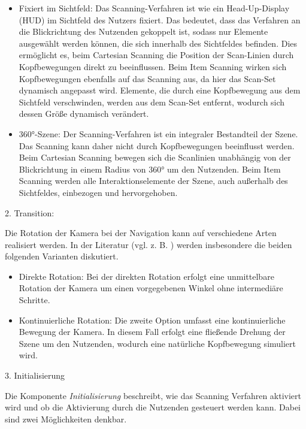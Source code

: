 \begin{itemize}
    \item Fixiert im Sichtfeld: Das Scanning-Verfahren ist wie ein Head-Up-Display (HUD) im Sichtfeld des Nutzers fixiert. Das bedeutet, dass das Verfahren an die Blickrichtung des Nutzenden gekoppelt ist, sodass nur Elemente ausgewählt werden können, die sich innerhalb des Sichtfeldes befinden. Dies ermöglicht es, beim Cartesian Scanning die Position der Scan-Linien durch Kopfbewegungen direkt zu beeinflussen. Beim Item Scanning wirken sich Kopfbewegungen ebenfalls auf das Scanning aus, da hier das Scan-Set dynamisch angepasst wird. Elemente, die durch eine Kopfbewegung aus dem Sichtfeld verschwinden, werden aus dem Scan-Set entfernt, wodurch sich dessen Größe dynamisch verändert.
    \item 360°-Szene: Der Scanning-Verfahren ist ein integraler Bestandteil der Szene. Das Scanning kann daher nicht durch Kopfbewegungen beeinflusst werden. Beim Cartesian Scanning bewegen sich die Scanlinien unabhängig von der Blickrichtung in einem Radius von 360° um den Nutzenden. Beim Item Scanning werden alle Interaktionselemente der Szene, auch außerhalb des Sichtfeldes, einbezogen und hervorgehoben. 
\end{itemize}

2. Transition: 

Die Rotation der Kamera bei der Navigation kann auf verschiedene Arten realisiert werden. In der Literatur (vgl. z. B. \citet{10.1145/3441852.3471230, 10.1007/s10055-020-00425-x, 8797722}) werden insbesondere die beiden folgenden Varianten diskutiert.

\begin{itemize}
    \item Direkte Rotation: Bei der direkten Rotation erfolgt eine unmittelbare Rotation der Kamera um einen vorgegebenen Winkel ohne intermediäre Schritte. 
    \item Kontinuierliche Rotation: Die zweite Option umfasst eine kontinuierliche Bewegung der Kamera. In diesem Fall erfolgt eine fließende Drehung der Szene um den Nutzenden, wodurch eine natürliche Kopfbewegung simuliert wird. 
\end{itemize}

3. Initialisierung 

Die Komponente \textit{Initialisierung} beschreibt, wie das Scanning Verfahren aktiviert wird und ob die Aktivierung durch die Nutzenden gesteuert werden kann. Dabei sind zwei Möglichkeiten denkbar. 


